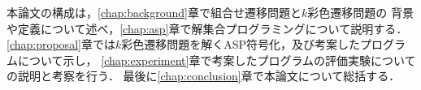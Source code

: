 本論文の構成は，\ref{chap:background}章で組合せ遷移問題と$k$彩色遷移問題の
背景や定義について述べ，\ref{chap:asp}章で解集合プログラミングについて説明する．
\ref{chap:proposal}章では$k$彩色遷移問題を解くASP符号化，及び考案したプログラムについて示し，
\ref{chap:experiment}章で考案したプログラムの評価実験についての説明と考察を行う．
最後に\ref{chap:conclusion}章で本論文について総括する．

\begin{comment}
近年ソフトウェアやハードウェア技術の進歩により，
効率的なアルゴリズムが存在しないような問題であっても社会での実用が見込める程度の時間で解けるようになってきた．
NP完全の一つでもある充足可能性問題はその一例である．

一方で現実にはより計算が困難とされる問題が存在する．
\textbf{組合せ遷移問題}はクラスPSPACEに属する問題群であり，
クラスNPなどに属する探索問題を基としている．
社会的には持続可能なシステムへの応用が期待されている．

組合せ遷移問題では基となる探索問題の実行可能解を頂点とした\textbf{解空間グラフ}上での，
二つの実行可能解，つまり二つの頂点間の経路の存在について問う．
このとき解空間グラフの辺は\textbf{隣接関係}により定義され，隣接関係は探索問題ごとに異なる．

\textbf{$k$彩色遷移問題}は組合せ遷移問題の一つであり，
グラフ点彩色問題を基としている．
問題の入力はグラフ$G$，色数$k$，及び$G$と$k$をグラフ点彩色問題としたときの二つの実行可能解である．
隣接関係は$G$を$k$彩色したときに一つの頂点のみ色が異なるような実行可能解である．

現在，一般に$k \ge 4$においてPSPACE完全であることがわかっている．
$k$彩色遷移問題では，グラフの形や色数に制限を加えることで多項式時間で解ける問題があること
がわかっているが，汎用的かつ効率的なアルゴリズムは見つかっていない．

解集合プログラミング(ASP; \cite{%
Baral03:cambridge,%
Gelfond88:iclp,%
Niemela99:amai,%
Inoue08:jssst})
は，一般拡張宣言プログラムをベースとしている．
ASP言語は一階論理に基づいた知識表現言語の一種であり，
論理プログラムはルールの有限集合である．
ASPシステムは安定モデル理論~\cite{Gelfond88:iclp}に基づいており，
近年のSATソルバーの発達により高速なものが実現されている．
現在，システム検証やプランニングといった様々な分野において実用化が進んでいる~\cite{Erdem16:AI}.

本論文では，解集合プログラミングを用いた$k$彩色遷移問題の解法について述べる．
本研究では問題の入力に遷移回数$t$を加え，「$t$回で遷移可能な経路が存在するか」を解くものとする．
この場合，考えられるすべての$t$において解くことで元の問題を解くことが可能である．
本研究ではグラフ$G$と二つの実行可能解をASPファクトとして表現した．
また，$k$彩色遷移問題を解く3種類のASP符号化，
\code{vrc1}，\code{vrc2}，\code{vrc3}を提案した．
これらの符号化は隣接関係に関するルールが異なる．
\code{vrc1}は基本的な符号化である．
\code{vrc2}は\code{vrc1}に\code{changed}というアトムを加え，
ASPの個数制約により隣接関係を表している．
\code{vrc3}は\code{vrc1}に\code{unchanged}というアトムを加え，
個数制約により隣接関係を表している．
アトムを追加することにより，基礎化後の隣接関係に関するルール数を減らすことに成功した．


\end{comment}
